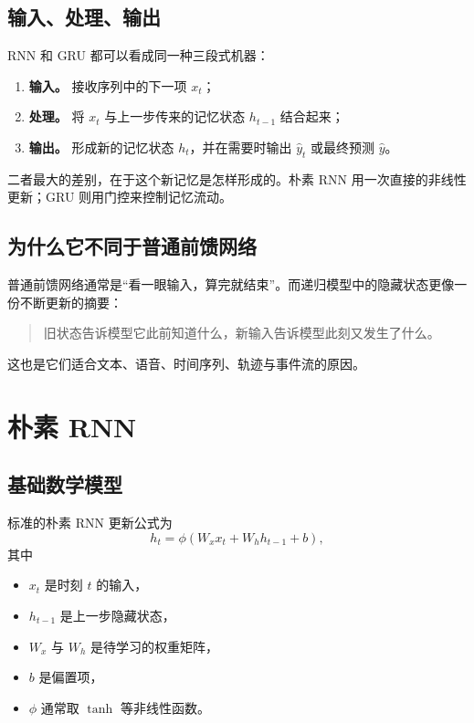 \documentclass[12pt,a4paper]{ctexart}
\begin{document}
\subsection{输入、处理、输出}

RNN 和 GRU 都可以看成同一种三段式机器：

\begin{enumerate}
  \item \textbf{输入。} 接收序列中的下一项 \(x_t\)；
  \item \textbf{处理。} 将 \(x_t\) 与上一步传来的记忆状态 \(h_{t-1}\) 结合起来；
  \item \textbf{输出。} 形成新的记忆状态 \(h_t\)，并在需要时输出 \(\hat{y}_t\) 或最终预测 \(\hat{y}\)。
\end{enumerate}

二者最大的差别，在于这个新记忆是怎样形成的。朴素 RNN 用一次直接的非线性更新；GRU 则用门控来控制记忆流动。

\subsection{为什么它不同于普通前馈网络}

普通前馈网络通常是“看一眼输入，算完就结束”。而递归模型中的隐藏状态更像一份不断更新的摘要：
\begin{quote}
旧状态告诉模型它此前知道什么，新输入告诉模型此刻又发生了什么。
\end{quote}

这也是它们适合文本、语音、时间序列、轨迹与事件流的原因。

\section{朴素 RNN}

\subsection{基础数学模型}

标准的朴素 RNN 更新公式为
\[
h_t = \phi(W_x x_t + W_h h_{t-1} + b),
\]
其中
\begin{itemize}
  \item \(x_t\) 是时刻 \(t\) 的输入，
  \item \(h_{t-1}\) 是上一步隐藏状态，
  \item \(W_x\) 与 \(W_h\) 是待学习的权重矩阵，
  \item \(b\) 是偏置项，
  \item \(\phi\) 通常取 \(\tanh\) 等非线性函数。
\end{itemize}
\end{document}
